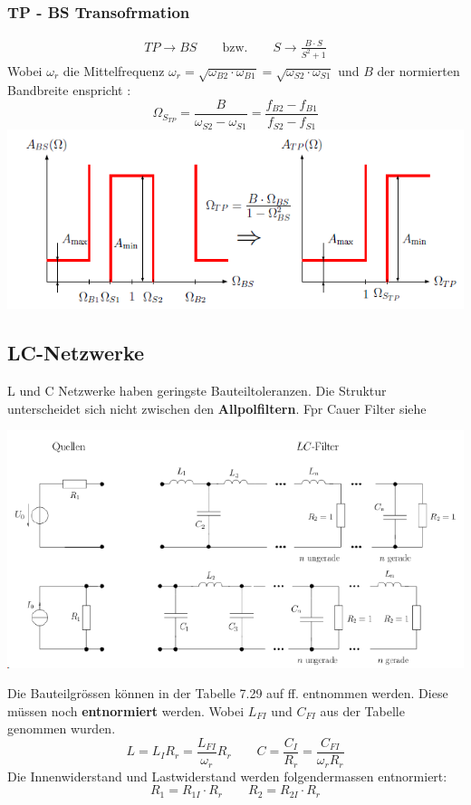\subsubsection{TP - BS Transofrmation}
\begin{align*}
	TP \rightarrow BS \qquad \text{bzw.} \qquad S \rightarrow \frac{B\cdot S}{S^2 + 1}
\end{align*}
Wobei $\omega_r$ die Mittelfrequenz $\omega_r = \sqrt{\omega_{B2}\cdot \omega_{B1}} =  \sqrt{\omega_{S2}\cdot \omega_{S1}}$ und $B$ der normierten Bandbreite enspricht :
\[
\Omega_{S_{TP}} = \frac{B}{\omega_{S2} - \omega_{S1}} = \frac{f_{B2} - f_{B1}}{f_{S2} - f_{S1}}
\]
\includegraphics[width=\columnwidth]{Images/tpbs}


\subsection{LC-Netzwerke}
L und C Netzwerke haben geringste Bauteiltoleranzen. Die Struktur unterscheidet sich nicht zwischen den \textbf{Allpolfiltern}. Fpr Cauer Filter siehe 
\begin{center}
	\includegraphics[width=\columnwidth]{Images/struktur}
\end{center}

Die Bauteilgrössen können in der Tabelle 7.29 auf  ff. entnommen werden. Diese müssen noch \textbf{entnormiert} werden. Wobei $L_{FI}$ und $ C_{FI}$ aus der Tabelle genommen wurden.
\[
L = L_I R_r = \frac{L_{FI}}{\omega_r}R_r \qquad C = \frac{C_I}{R_r} = \frac{C_{FI}}{\omega_rR_r}
\]
Die Innenwiderstand und Lastwiderstand werden folgendermassen entnormiert:
\[
R_1 = R_{1I}\cdot R_r \qquad R_2 = R_{2I}\cdot R_r 
\]